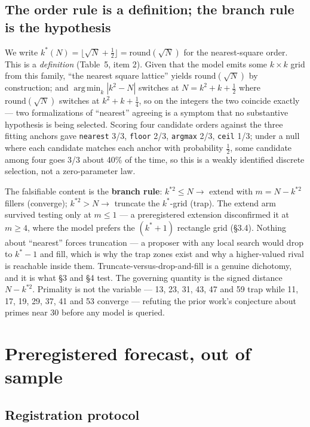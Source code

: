 \documentclass[11pt]{article}
\DeclareMathOperator*{\argmin}{arg\,min}
\begin{document}
\subsection{The order rule is a definition; the branch rule is the hypothesis}

We write $k^{*}(N) = \lfloor \sqrt{N} + \tfrac{1}{2} \rfloor = \mathrm{round}(\sqrt{N})$ for the nearest-square order. This is a \textit{definition}
(Table~5, item 2). Given that the model emits some $k \times k$ grid from this family, ``the nearest
square lattice'' yields $\mathrm{round}(\sqrt{N})$ by construction; and $\argmin_k |k^2 - N|$ switches at
$N = k^2 + k + \tfrac{1}{2}$ where $\mathrm{round}(\sqrt{N})$ switches at $k^2 + k + \tfrac{1}{4}$, so on the integers the two coincide
exactly --- two formalizations of ``nearest'' agreeing is a symptom that no substantive hypothesis
is being selected. Scoring four candidate orders against the three fitting anchors gave
\texttt{nearest} 3/3, \texttt{floor} 2/3, \texttt{argmax} 2/3, \texttt{ceil} 1/3; under a null where each candidate matches
each anchor with probability $\tfrac{1}{2}$, some candidate among four goes 3/3 about 40\% of the time, so
this is a weakly identified discrete selection, not a zero-parameter law.

The falsifiable content is the \textbf{branch rule}: $k^{*2} \le N \rightarrow$ extend with $m = N - k^{*2}$ fillers
(converge); $k^{*2} > N \rightarrow$ truncate the $k^{*}$-grid (trap). The extend arm survived testing only at
$m \le 1$ --- a preregistered extension disconfirmed it at $m \ge 4$, where the model prefers the
$(k^{*}+1)$ rectangle grid (\S3.4). Nothing about ``nearest'' forces truncation ---
a proposer with any local search would drop to $k^{*}-1$ and fill, which is why the trap zones exist
and why a higher-valued rival is reachable inside them. Truncate-versus-drop-and-fill is a
genuine dichotomy, and it is what \S3 and \S4 test. The governing quantity is the signed distance
$N - k^{*2}$. Primality is not the variable --- 13, 23, 31, 43, 47 and 59 trap while 11, 17, 19, 29,
37, 41 and 53 converge --- refuting the prior work's conjecture about primes near 30 before any
model is queried.

\section{Preregistered forecast, out of sample}

\subsection{Registration protocol}
\end{document}
